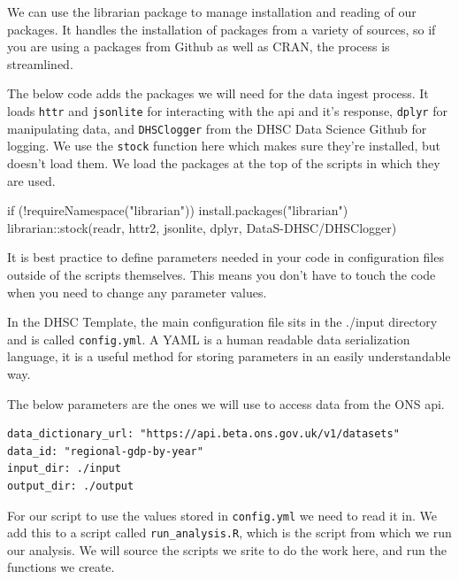 \documentclass[
  letterpaper,
]{book}
\newenvironment{Shaded}{\begin{snugshade}}{\end{snugshade}}
\newcommand{\ControlFlowTok}[1]{\textcolor[rgb]{0.00,0.23,0.31}{#1}}
\newcommand{\FunctionTok}[1]{\textcolor[rgb]{0.28,0.35,0.67}{#1}}
\newcommand{\NormalTok}[1]{\textcolor[rgb]{0.00,0.23,0.31}{#1}}
\newcommand{\SpecialCharTok}[1]{\textcolor[rgb]{0.37,0.37,0.37}{#1}}
\newcommand{\StringTok}[1]{\textcolor[rgb]{0.13,0.47,0.30}{#1}}
\begin{document}
We can use the librarian package to manage installation and reading of
our packages. It handles the installation of packages from a variety of
sources, so if you are using a packages from Github as well as CRAN, the
process is streamlined.

The below code adds the packages we will need for the data ingest
process. It loads \texttt{httr} and \texttt{jsonlite} for interacting
with the api and it's response, \texttt{dplyr} for manipulating data,
and \texttt{DHSClogger} from the DHSC Data Science Github for logging.
We use the \texttt{stock} function here which makes sure they're
installed, but doesn't load them. We load the packages at the top of the
scripts in which they are used.

\begin{Shaded}
\begin{Highlighting}[]
\ControlFlowTok{if}\NormalTok{ (}\SpecialCharTok{!}\FunctionTok{requireNamespace}\NormalTok{(}\StringTok{"librarian"}\NormalTok{)) }\FunctionTok{install.packages}\NormalTok{(}\StringTok{"librarian"}\NormalTok{)}
\NormalTok{librarian}\SpecialCharTok{::}\FunctionTok{stock}\NormalTok{(readr, httr2, jsonlite, dplyr, DataS}\SpecialCharTok{{-}}\NormalTok{DHSC}\SpecialCharTok{/}\NormalTok{DHSClogger)}
\end{Highlighting}
\end{Shaded}

It is best practice to define parameters needed in your code in
configuration files outside of the scripts themselves. This means you
don't have to touch the code when you need to change any parameter
values.

In the DHSC Template, the main configuration file sits in the ./input
directory and is called \texttt{config.yml}. A YAML is a human readable
data serialization language, it is a useful method for storing
parameters in an easily understandable way.

The below parameters are the ones we will use to access data from the
ONS api.

\begin{verbatim}
data_dictionary_url: "https://api.beta.ons.gov.uk/v1/datasets"
data_id: "regional-gdp-by-year"
input_dir: ./input
output_dir: ./output
\end{verbatim}

For our script to use the values stored in \texttt{config.yml} we need
to read it in. We add this to a script called \texttt{run\_analysis.R},
which is the script from which we run our analysis. We will source the
scripts we srite to do the work here, and run the functions we create.
\end{document}
